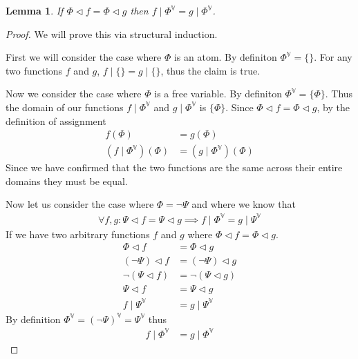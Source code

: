 \documentclass{article}
\newtheorem{lem}{Lemma}
\begin{document}
\begin{lem}
If $\Phi \lhd f = \Phi \lhd g$ then $f \mid \Phi^\mathbb{V} = g \mid \Phi^\mathbb{V}$.
\end{lem}
\begin{proof}
We will prove this via structural induction.

First we will consider the case where $\Phi$ is an atom.
By definiton $\Phi^\mathbb{V} = \{\}$.
For any two functions $f$ and $g$, $f \mid \{\} = g \mid \{\}$,
thus the claim is true.

Now we consider the case where $\Phi$ is a free variable.
By definiton $\Phi^\mathbb{V} = \{\Phi\}$.
Thus the domain of our functions $f\mid\Phi^\mathbb{V}$ and $g\mid\Phi^\mathbb{V}$ is $\{\Phi\}$.
Since $\Phi \lhd f = \Phi \lhd g$, by the definition of assignment
\begin{align*}
f(\Phi) &= g(\Phi) \\
(f\mid\Phi^\mathbb{V})(\Phi) &= (g\mid\Phi^\mathbb{V})(\Phi)
\end{align*}
Since we have confirmed that the two functions are the same across their entire domains they must be equal.

Now let us consider the case where $\Phi = \neg \Psi$ and where we know that
\begin{align*}
\forall f,g: \Psi \lhd f = \Psi \lhd g \implies f\mid\Phi^\mathbb{V}=g\mid\Psi^\mathbb{V}
\end{align*}
If we have two arbitrary functions $f$ and $g$ where $\Phi\lhd f=\Phi\lhd g$.
\begin{align*}
\Phi\lhd f        &= \Phi\lhd g      \\
(\neg\Psi)\lhd f &= (\neg\Psi)\lhd g \\
\neg(\Psi\lhd f) &= \neg(\Psi\lhd g) \\
\Psi\lhd f &= \Psi\lhd g             \\
f\mid\Psi^\mathbb{V} &= g\mid\Psi^\mathbb{V}
\end{align*}
By definition $\Phi^\mathbb{V} = (\neg\Psi)^\mathbb{V} = \Psi^\mathbb{V}$ thus
\begin{align*}
f\mid\Phi^\mathbb{V} &= g\mid\Phi^\mathbb{V}
\end{align*}


\end{proof}
\end{document}
